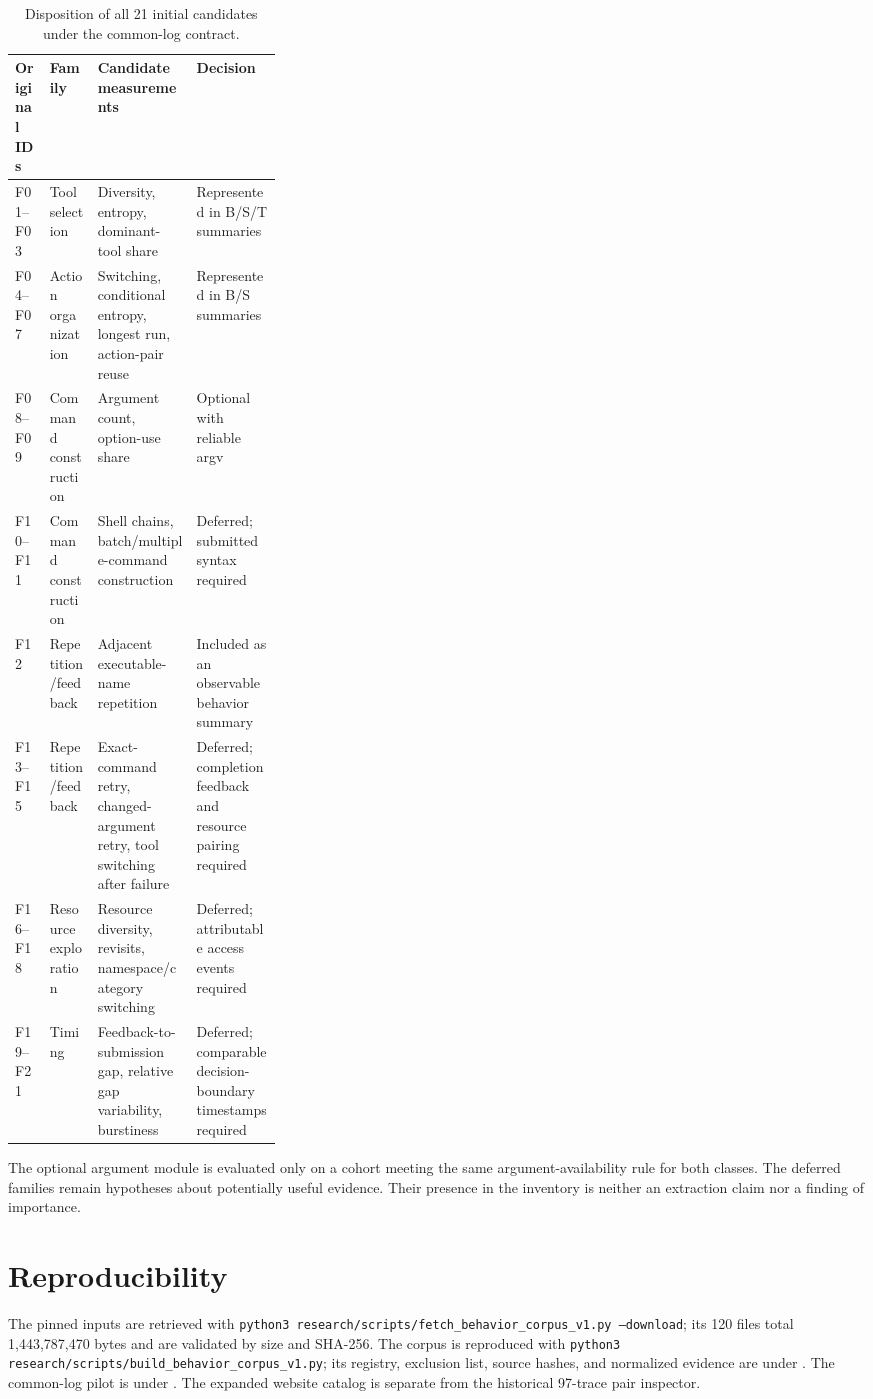 \documentclass[10pt]{article}
\begin{document}
\begin{table}[htbp]
\centering
\caption{Disposition of all 21 initial candidates under the common-log contract.}
\label{tab:inventory}
\begin{tabularx}{\linewidth}{@{}p{0.13\linewidth}p{0.18\linewidth}YY@{}}
\toprule
Original IDs & Family & Candidate measurements & Decision \\
\midrule
F01--F03 & Tool selection & Diversity, entropy, dominant-tool share & Represented in B/S/T summaries \\
F04--F07 & Action organization & Switching, conditional entropy, longest run, action-pair reuse & Represented in B/S summaries \\
F08--F09 & Command construction & Argument count, option-use share & Optional with reliable argv \\
F10--F11 & Command construction & Shell chains, batch/multiple-command construction & Deferred; submitted syntax required \\
F12 & Repetition/feedback & Adjacent executable-name repetition & Included as an observable behavior summary \\
F13--F15 & Repetition/feedback & Exact-command retry, changed-argument retry, tool switching after failure & Deferred; completion feedback and resource pairing required \\
F16--F18 & Resource exploration & Resource diversity, revisits, namespace/category switching & Deferred; attributable access events required \\
F19--F21 & Timing & Feedback-to-submission gap, relative gap variability, burstiness & Deferred; comparable decision-boundary timestamps required \\
\bottomrule
\end{tabularx}
\end{table}

The optional argument module is evaluated only on a cohort meeting the same argument-availability rule for both classes. The deferred families remain hypotheses about potentially useful evidence. Their presence in the inventory is neither an extraction claim nor a finding of importance.

\section{Reproducibility}
The pinned inputs are retrieved with \texttt{python3 research/scripts/fetch\_behavior\_corpus\_v1.py --download}; its 120 files total 1,443,787,470 bytes and are validated by size and SHA-256. The corpus is reproduced with \texttt{python3 research/scripts/build\_behavior\_corpus\_v1.py}; its registry, exclusion list, source hashes, and normalized evidence are under . The common-log pilot is under . The expanded website catalog is separate from the historical 97-trace pair inspector.
\end{document}
